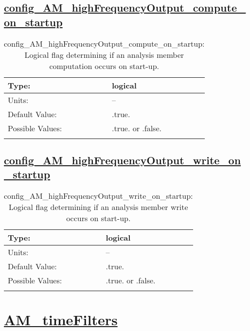 \subsection[config\_AM\_highFrequencyOutput\_compute\_on\_startup]{\hyperref[sec:nm_tab_AM_highFrequencyOutput]{config\_AM\_highFrequencyOutput\_compute\_on\_startup}}
\label{subsec:nm_sec_config_AM_highFrequencyOutput_compute_on_startup}
\begin{center}
\begin{longtable}{| p{2.0in} || p{4.0in} |}
    \hline
    Type: & logical \\
    \hline
    Units: & -- \\
    \hline
    Default Value: & .true. \\
    \hline
    Possible Values: & .true. or .false. \\
    \hline
    \caption{config\_AM\_highFrequencyOutput\_compute\_on\_startup: Logical flag determining if an analysis member computation occurs on start-up.}
\end{longtable}
\end{center}
\subsection[config\_AM\_highFrequencyOutput\_write\_on\_startup]{\hyperref[sec:nm_tab_AM_highFrequencyOutput]{config\_AM\_highFrequencyOutput\_write\_on\_startup}}
\label{subsec:nm_sec_config_AM_highFrequencyOutput_write_on_startup}
\begin{center}
\begin{longtable}{| p{2.0in} || p{4.0in} |}
    \hline
    Type: & logical \\
    \hline
    Units: & -- \\
    \hline
    Default Value: & .true. \\
    \hline
    Possible Values: & .true. or .false. \\
    \hline
    \caption{config\_AM\_highFrequencyOutput\_write\_on\_startup: Logical flag determining if an analysis member write occurs on start-up.}
\end{longtable}
\end{center}
\section[AM\_timeFilters]{\hyperref[sec:nm_tab_AM_timeFilters]{AM\_timeFilters}}
\label{sec:nm_sec_AM_timeFilters}
